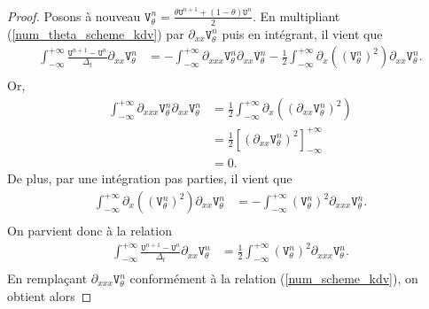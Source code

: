 \documentclass[12pt,a4paper]{article}
\numberwithin{equation}{section}
\begin{document}
\begin{proof}
    Posons à nouveau $\texttt{V}_\theta^n = \frac{\theta\texttt{U}^{n+1} + (1-\theta)\texttt{U}^{n}}{2}$. En multipliant (\ref{num_theta_scheme_kdv}) par $\partial_{xx}\texttt{V}^n_\theta$ puis en intégrant, il vient que
\begin{equation*}
\begin{split}
    \int_{-\infty}^{+\infty}\frac{\texttt{U}^{n+1}-\texttt{U}^n}{\Delta_t}\partial_{xx}\texttt{V}_\theta^n
    &= -\int_{-\infty}^{+\infty} \partial_{xxx} \texttt{V}_\theta^n\partial_{xx}\texttt{V}_\theta^n  -\frac{1}{2}\int_{-\infty}^{+\infty} \partial_{x}\left( \left(\texttt{V}_\theta^n\right)^2 \right)\partial_{xx}\texttt{V}_\theta^n. \\
\end{split}
\end{equation*}
Or,
\begin{equation*}
\begin{split}
    \int_{-\infty}^{+\infty}\partial_{xxx}\texttt{V}_\theta^n  \partial_{xx}\texttt{V}_\theta^n
    &= \frac{1}{2}\int_{-\infty}^{+\infty} \partial_{x}\left((\partial_{xx}\texttt{V}_\theta^n)^2\right) \\
    &= \frac{1}{2}\left[  (\partial_{xx}\texttt{V}_\theta^n)^2\right]_{-\infty}^{+\infty} \\
    &= 0.
\end{split}
\end{equation*}
De plus, par une intégration pas parties, il vient que
\begin{equation*}
\begin{split}
   \int_{-\infty}^{+\infty} \partial_{x}\left( \left(\texttt{V}_\theta^n\right)^2 \right)\partial_{xx}\texttt{V}_\theta^n
    &=-\int_{-\infty}^{+\infty} \left(\texttt{V}_\theta^n\right)^2 \partial_{xxx}\texttt{V}_\theta^n. \\
\end{split}
\end{equation*}
On parvient donc à la relation
\begin{equation*}
\begin{split}
    \int_{-\infty}^{+\infty}\frac{\texttt{U}^{n+1}-\texttt{U}^n}{\Delta_t}\partial_{xx}\texttt{V}_\theta^n
    &= \frac{1}{2}\int_{-\infty}^{+\infty} \left(\texttt{V}_\theta^n\right)^2 \partial_{xxx}\texttt{V}_\theta^n .\\
\end{split}
\end{equation*}
En remplaçant $\partial_{xxx}\texttt{V}_\theta^n$ conformément à la relation (\ref{num_scheme_kdv}), on obtient alors

\end{proof}
\end{document}
